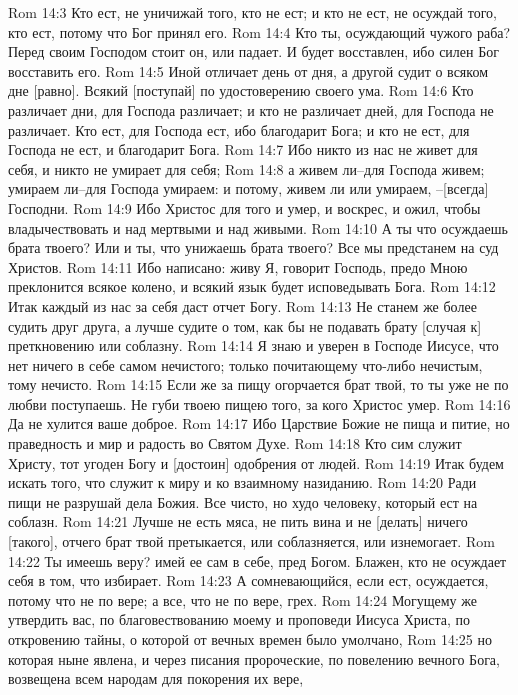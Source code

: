 Rom 14:3  Кто ест, не уничижай того, кто не ест; и кто не ест, не осуждай того, кто ест, потому что Бог принял его.
Rom 14:4  Кто ты, осуждающий чужого раба? Перед своим Господом стоит он, или падает. И будет восставлен, ибо силен Бог восставить его.
Rom 14:5  Иной отличает день от дня, а другой судит о всяком дне [равно]. Всякий [поступай] по удостоверению своего ума.
Rom 14:6  Кто различает дни, для Господа различает; и кто не различает дней, для Господа не различает. Кто ест, для Господа ест, ибо благодарит Бога; и кто не ест, для Господа не ест, и благодарит Бога.
Rom 14:7  Ибо никто из нас не живет для себя, и никто не умирает для себя;
Rom 14:8  а живем ли--для Господа живем; умираем ли--для Господа умираем: и потому, живем ли или умираем, --[всегда] Господни.
Rom 14:9  Ибо Христос для того и умер, и воскрес, и ожил, чтобы владычествовать и над мертвыми и над живыми.
Rom 14:10  А ты что осуждаешь брата твоего? Или и ты, что унижаешь брата твоего? Все мы предстанем на суд Христов.
Rom 14:11  Ибо написано: живу Я, говорит Господь, предо Мною преклонится всякое колено, и всякий язык будет исповедывать Бога.
Rom 14:12  Итак каждый из нас за себя даст отчет Богу.
Rom 14:13  Не станем же более судить друг друга, а лучше судите о том, как бы не подавать брату [случая к] преткновению или соблазну.
Rom 14:14  Я знаю и уверен в Господе Иисусе, что нет ничего в себе самом нечистого; только почитающему что-либо нечистым, тому нечисто.
Rom 14:15  Если же за пищу огорчается брат твой, то ты уже не по любви поступаешь. Не губи твоею пищею того, за кого Христос умер.
Rom 14:16  Да не хулится ваше доброе.
Rom 14:17  Ибо Царствие Божие не пища и питие, но праведность и мир и радость во Святом Духе.
Rom 14:18  Кто сим служит Христу, тот угоден Богу и [достоин] одобрения от людей.
Rom 14:19  Итак будем искать того, что служит к миру и ко взаимному назиданию.
Rom 14:20  Ради пищи не разрушай дела Божия. Все чисто, но худо человеку, который ест на соблазн.
Rom 14:21  Лучше не есть мяса, не пить вина и не [делать] ничего [такого], отчего брат твой претыкается, или соблазняется, или изнемогает.
Rom 14:22  Ты имеешь веру? имей ее сам в себе, пред Богом. Блажен, кто не осуждает себя в том, что избирает.
Rom 14:23  А сомневающийся, если ест, осуждается, потому что не по вере; а все, что не по вере, грех.
Rom 14:24  Могущему же утвердить вас, по благовествованию моему и проповеди Иисуса Христа, по откровению тайны, о которой от вечных времен было умолчано,
Rom 14:25  но которая ныне явлена, и через писания пророческие, по повелению вечного Бога, возвещена всем народам для покорения их вере,
